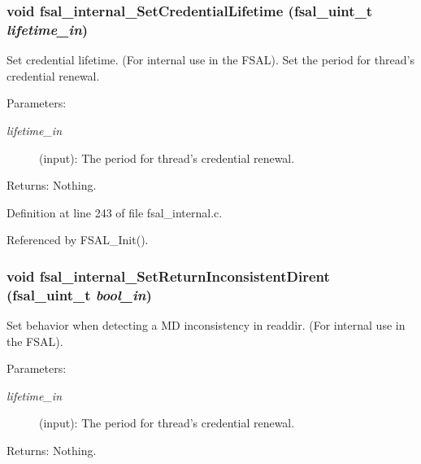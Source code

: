 \subsubsection[{fsal\_\-internal\_\-SetCredentialLifetime}]{\setlength{\rightskip}{0pt plus 5cm}void fsal\_\-internal\_\-SetCredentialLifetime (fsal\_\-uint\_\-t {\em lifetime\_\-in})}\label{fsal__internal_8c_52fbd60f6f8f222868f133a1ca585bd1}


Set credential lifetime. (For internal use in the FSAL). Set the period for thread's credential renewal.

\begin{Desc}
\item[Parameters:]
\begin{description}
\item[{\em lifetime\_\-in}](input): The period for thread's credential renewal.\end{description}
\end{Desc}
\begin{Desc}
\item[Returns:]Nothing. \end{Desc}


Definition at line 243 of file fsal\_\-internal.c.

Referenced by FSAL\_\-Init().
\subsubsection[{fsal\_\-internal\_\-SetReturnInconsistentDirent}]{\setlength{\rightskip}{0pt plus 5cm}void fsal\_\-internal\_\-SetReturnInconsistentDirent (fsal\_\-uint\_\-t {\em bool\_\-in})}\label{fsal__internal_8c_c9a6a99ea408b452eb6f232ae3ed5271}


Set behavior when detecting a MD inconsistency in readdir. (For internal use in the FSAL).

\begin{Desc}
\item[Parameters:]
\begin{description}
\item[{\em lifetime\_\-in}](input): The period for thread's credential renewal.\end{description}
\end{Desc}
\begin{Desc}
\item[Returns:]Nothing. \end{Desc}


